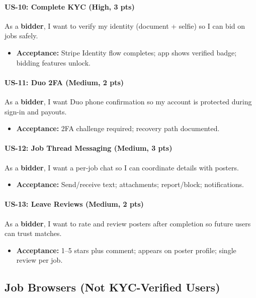 \documentclass[11pt]{article}
\begin{document}
\paragraph{US-10: Complete KYC (High, 3 pts)}
As a \textbf{bidder}, I want to verify my identity (document + selfie) so I can bid on jobs safely.
\begin{itemize}[leftmargin=1.4em]
  \item \textbf{Acceptance:} Stripe Identity flow completes; app shows verified badge; bidding features unlock.
\end{itemize}

\paragraph{US-11: Duo 2FA (Medium, 2 pts)}
As a \textbf{bidder}, I want Duo phone confirmation so my account is protected during sign-in and payouts.
\begin{itemize}[leftmargin=1.4em]
  \item \textbf{Acceptance:} 2FA challenge required; recovery path documented.
\end{itemize}

\paragraph{US-12: Job Thread Messaging (Medium, 3 pts)}
As a \textbf{bidder}, I want a per-job chat so I can coordinate details with posters.
\begin{itemize}[leftmargin=1.4em]
  \item \textbf{Acceptance:} Send/receive text; attachments; report/block; notifications.
\end{itemize}

\paragraph{US-13: Leave Reviews (Medium, 2 pts)}
As a \textbf{bidder}, I want to rate and review posters after completion so future users can trust matches.
\begin{itemize}[leftmargin=1.4em]
  \item \textbf{Acceptance:} 1–5 stars plus comment; appears on poster profile; single review per job.
\end{itemize}

\subsection*{Job Browsers (Not KYC-Verified Users)}
\end{document}
